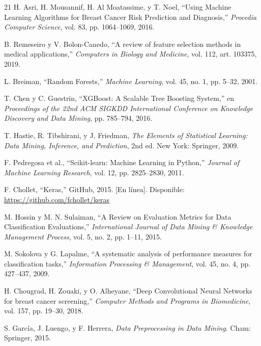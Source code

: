 \documentclass[journal]{IEEEtran}
\begin{document}
\begin{thebibliography}{21}
H. Asri, H. Mousannif, H. Al Moatassime, y T. Noel, ``Using Machine Learning Algorithms for Breast Cancer Risk Prediction and Diagnosis,'' \textit{Procedia Computer Science}, vol. 83, pp. 1064--1069, 2016.

B. Remeseiro y V. Bolon-Canedo, ``A review of feature selection methods in medical applications,'' \textit{Computers in Biology and Medicine}, vol. 112, art. 103375, 2019.

L. Breiman, ``Random Forests,'' \textit{Machine Learning}, vol. 45, no. 1, pp. 5--32, 2001.

T. Chen y C. Guestrin, ``XGBoost: A Scalable Tree Boosting System,'' en \textit{Proceedings of the 22nd ACM SIGKDD International Conference on Knowledge Discovery and Data Mining}, pp. 785--794, 2016.

T. Hastie, R. Tibshirani, y J. Friedman, \textit{The Elements of Statistical Learning: Data Mining, Inference, and Prediction}, 2nd ed. New York: Springer, 2009.

F. Pedregosa et al., ``Scikit-learn: Machine Learning in Python,'' \textit{Journal of Machine Learning Research}, vol. 12, pp. 2825--2830, 2011.

F. Chollet, ``Keras,'' GitHub, 2015. [En línea]. Disponible: \url{https://github.com/fchollet/keras}

M. Hossin y M. N. Sulaiman, ``A Review on Evaluation Metrics for Data Classification Evaluations,'' \textit{International Journal of Data Mining \& Knowledge Management Process}, vol. 5, no. 2, pp. 1--11, 2015.

M. Sokolova y G. Lapalme, ``A systematic analysis of performance measures for classification tasks,'' \textit{Information Processing \& Management}, vol. 45, no. 4, pp. 427--437, 2009.

H. Chougrad, H. Zouaki, y O. Alheyane, ``Deep Convolutional Neural Networks for breast cancer screening,'' \textit{Computer Methods and Programs in Biomedicine}, vol. 157, pp. 19--30, 2018.

S. García, J. Luengo, y F. Herrera, \textit{Data Preprocessing in Data Mining}. Cham: Springer, 2015.

\end{thebibliography}
\end{document}

